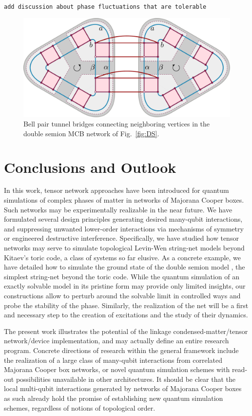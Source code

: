\documentclass[twocolumn,floats,prx,showpacs]{revtex4-1}
\newcommand{\rein}[1]{{\color{rein} #1}}
\begin{document}
\rein{{\tt add discussion about phase fluctuations that are tolerable}}



\begin{figure}
\includegraphics[width=0.9\columnwidth]{fig/tworing.pdf}
\caption{Bell pair tunnel bridges 
connecting neighboring vertices in the double semion MCB network of Fig.~\ref{fig:DS}.  }
\label{fig:tworings}
\end{figure}

\section{Conclusions and Outlook}\label{sec5}

In this work, tensor network approaches have been introduced for quantum simulations of complex phases of matter in networks of Majorana Cooper boxes.  Such networks may be experimentally realizable in the near future. We have formulated several design principles generating desired  many-qubit interactions, and suppressing unwanted lower-order interactions via mechanisms of symmetry or engineered destructive interference. 
Specifically, we have studied how tensor networks may serve to simulate topological Levin-Wen string-net models \cite{Levin2005,Wen2017} beyond Kitaev's toric code, a class of systems so far elusive.   As a concrete  example, we have detailed how to simulate the ground state of the double semion model \cite{Levin2005}, the  simplest string-net beyond the toric code.  While the quantum simulation of an exactly solvable model in its pristine form may  provide only limited insights,  our constructions  allow to perturb around the solvable limit in controlled ways and probe the stability of the phase. Similarly, the realization of the net will be a first and necessary step to the creation of excitations and the study of their dynamics.


The present work illustrates the potential of the linkage condensed-matter/tensor network/device implementation, and may actually define an
entire research program. Concrete  directions of research within the general framework include the realization of a   large class of many-qubit interactions from correlated Majorana Cooper box networks, or novel quantum simulation schemes \cite{CiracZollerSimulation,Roadmap} with read-out possibilities \cite{Plugge2017,Karzig2017} unavailable in other architectures.  It should be clear that the local multi-qubit interactions generated by  networks of Majorana Cooper boxes as such already hold the promise of establishing new quantum simulation schemes, regardless of
notions of topological order.
\end{document}
